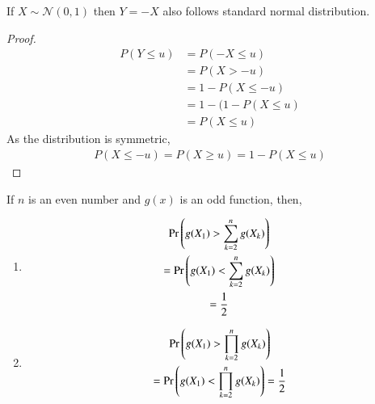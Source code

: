 \begin{lemma}
    If $X \sim \mathcal{N}(0,1)$ then $Y =-X$ also follows standard normal distribution.
\end{lemma}
\begin{proof}
\begin{align}
    P(Y \leq u) &= P(-X \leq u) \\
    &= P(X > -u) \\
    &= 1 - P(X \leq -u) \\
    &= 1 - (1 - P(X \leq u) \\
    &= P(X \leq u) 
\end{align}
As the distribution is symmetric, 
\begin{align}
 P(X\leq -u)=P(X\geq u)= 1-P(X\leq u)   
\end{align} 
\end{proof}
\begin{lemma}
    If $n$ is an even number and $g(x)$ is an odd function, then,
    \begin{enumerate}
        \item 
    \begin{multline}\label{indep/3/equality}
        \Pr\left(g(X_1)>\sum_{k=2}^ng(X_k)\right) \\=
        \Pr\left(g(X_1)<\sum_{k=2}^ng(X_k)\right) \\
        = \frac{1}{2}
    \end{multline}
    \item 
    \begin{multline}
        \Pr\left(g(X_1)>\prod_{k=2}^ng(X_k)\right)\\=
        \Pr\left(g(X_1)<\prod_{k=2}^ng(X_k)\right) = \frac{1}{2}
    \end{multline}
    
\end{enumerate}
\end{lemma}
